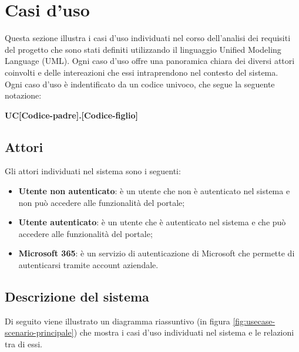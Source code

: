\section{Casi d'uso}\label{sec:usecase}
Questa sezione illustra i casi d'uso individuati nel corso dell'analisi dei requisiti del progetto che sono stati definiti utilizzando il linguaggio Unified Modeling Language (UML).
Ogni caso d'uso offre una panoramica chiara dei diversi attori coinvolti e delle intereazioni che essi intraprendono nel contesto del sistema.\\
Ogni caso d'uso è indentificato da un codice univoco, che segue la seguente notazione:

\begin{center}
    \textbf{UC[Codice-padre].[Codice-figlio]}
  \end{center}


\subsection{Attori}
Gli attori individuati nel sistema sono i seguenti:
\begin{itemize}
    \item \textbf{Utente non autenticato}: è un utente che non è autenticato nel sistema e non può accedere alle funzionalità del portale;
    \item \textbf{Utente autenticato}: è un utente che è autenticato nel sistema e che può accedere alle funzionalità del portale;
    \item \textbf{Microsoft 365}: è un servizio di autenticazione di Microsoft che permette di autenticarsi tramite account aziendale.

\end{itemize}

\clearpage


\subsection{Descrizione del sistema}

Di seguito viene illustrato un diagramma riassuntivo (in figura \ref{fig:usecase-scenario-principale}) che mostra i casi d'uso individuati nel sistema e le relazioni tra di essi.

